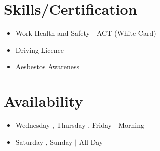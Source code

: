\documentclass{resume_class}
\begin{document}
	\section{Skills/Certification}
	\begin{itemize}[leftmargin = 10pt , labelsep = 3pt , parsep = 0pt , itemsep = 2pt , label =  {\small $\bullet$} ] 
		\item \mdseries \Large  {Work Health and Safety - ACT (White Card)}
                \item \mdseries \Large  {Driving Licence}
                \item \mdseries \Large  {Aesbestos Awareness}
                  
	\end{itemize}
	
	\section{Availability }
	\begin{itemize}[leftmargin = 10pt , labelsep = 3pt , parsep = 0pt , itemsep = 2pt , label =  {\small $\bullet$} ] 
		\item \mdseries \Large Wednesday , Thursday , Friday $|$ Morning
		\item \mdseries \Large Saturday , Sunday $|$ All Day
	\end{itemize}
	
\end{document}
